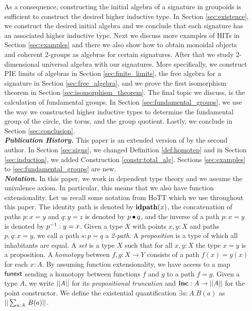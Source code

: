 As a consequence, constructing the initial algebra of a signature in groupoids is sufficient to construct the desired higher inductive type.
In Section \ref{sec:existence}, we construct the desired initial algebra and we conclude that each signature has an associated higher inductive type. 
Next we discuss more examples of HITs in Section \ref{sec:examples} and there we also show how to obtain monoidal objects and coherent 2-groups as algebras for certain signatures.
After that we study 2-dimensional universal algebra with our signatures.
More specifically, we construct PIE limits of algebras in Section \ref{sec:finite_limits}, the free algebra for a signature in Section \ref{sec:free_algebra}, and we prove the first isomorphism theorem in Section \ref{sec:isomorphism_theorem}.
The final topic we discuss, is the calculation of fundamental groups.
In Section \ref{sec:fundamental_groups}, we use the way we constructed higher inductive types to determine the fundamental group of the circle, the torus, and the group quotient.
Lastly, we conclude in Section \ref{sec:conclusion}.
\\
\emph{\textbf{Publication History.}}
This paper is an extended version of \cite{nmvdw2020} by the second author.
In Section \ref{sec:signs}, we changed Definition \ref{def:homotep} and in Section \ref{sec:induction}, we added Construction \ref{constr:total_alg}.
Sections \ref{sec:examples} to \ref{sec:fundamental_groups} are new.
\\
\emph{\textbf{Notation.}}
In this paper, we work in dependent type theory and we assume the univalence axiom. In particular, this means that we also have function extensionality.
Let us recall some notation from HoTT which we use throughout this paper.
The identity path is denoted by $\operatorname{\mathbf{idpath}}(x)$, the concatenation of paths $p : x = y$ and $q : y = z$ is denoted by $p \bullet q$, and the inverse of a path $p : x = y$ is denoted by $p^{-1} : y = x$.
Given a type $X$ with points $x, y : X$ and paths $p, q : x = y$, we call a path $s : p = q$ a \emph{2-path}.
A \emph{proposition} is a type of which all inhabitants are equal.
A \emph{set} is a type $X$ such that for all $x, y : X$ the type $x = y$ is a proposition.
A \emph{homotopy} between $f, g : X \rightarrow Y$ consists of a path
$f(x) = g(x)$ for each $x : A$. By assuming function
extensionality, we have access to a map $\mathsf{funext}$ sending a
homotopy between functions $f$ and $g$ to a path $f = g$. Given a
type $A$, we write $|| A ||$ for its \emph{propositional truncation}
and $\operatorname{\mathbf{inc}} : A \to || A ||$ for the point constructor. We define the existential quantification
$\exists a : A.B(a)$ as $\PT{\Sum {a : A}. B(a)}$.
